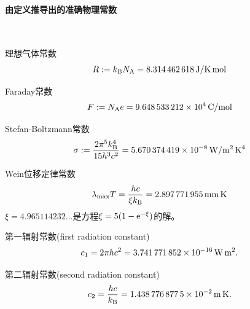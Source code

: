 \paragraph{由定义推导出的准确物理常数}~
\begin{compactitem}
	\item 理想气体常数
		\begin{align}
			R:=k_{\mathrm B}N_{\mathrm A}=\SI{8.314462618}{J/K.mol}
		\end{align} %
	\item Faraday常数
		\begin{align}
			F:=N_{\mathrm A} e=\SI{9.648533212E4}{C/mol}
		\end{align} %
	\item Stefan-Boltzmann常数
		\begin{align}
			\sigma:=\frac{2\pi^5k_{\mathrm B}^4}{15h^3c^2}=\SI{5.670374419E-8}{W/m^2.K^4}
		\end{align} %
	\item Wein位移定律常数
		\begin{align}
			\lambda_\mathrm{max} T=\frac{hc}{\xi k_{\mathrm B}}=\SI{2.897771955}{mm.K}
		\end{align} %
		$\xi=\num{4.965114232}\ldots$是方程$\xi=5(1-\mathop{}\!\mathrm{e}^{-\xi})$的解。
	\item 第一辐射常数(first radiation constant)
		\begin{equation}
			c_1=2\pi hc^2=\SI{3.741771852E-16}{W.m^2}.
		\end{equation} %
	\item 第二辐射常数(second radiation constant)
		\begin{equation}
			c_2=\frac{hc}{k_{\mathrm B}}=\SI{1.4387768775E-2}{m.K}.
		\end{equation} %
\end{compactitem}
